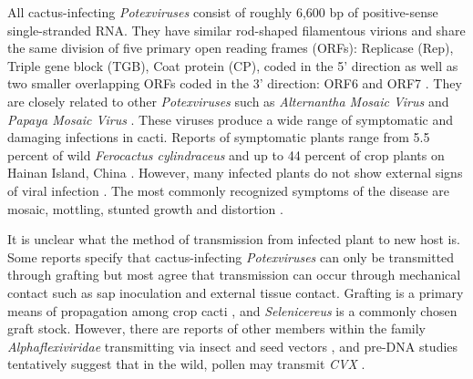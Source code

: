 \documentclass[11pt,letterpaper,titlepage]{article}
\begin{document}
\begin{linenumbers}
All cactus-infecting \textit{Potexviruses} consist of roughly 6,600 bp of positive-sense single-stranded RNA. They have similar rod-shaped filamentous virions and share the same division of five primary open reading frames (ORFs): Replicase (Rep), Triple gene block (TGB), Coat protein (CP), coded in the 5' direction as well as two smaller overlapping ORFs coded in the 3' direction: ORF6 and ORF7 \citep{evallo_brief_2021,liou_complete_2004, martelli_family_2007}.
They are closely related to other \textit{Potexviruses} such as \textit{Alternantha Mosaic Virus} and \textit{Papaya Mosaic Virus} \citep{martelli_family_2007,park_detection_2018,liou_complete_2004}.
These viruses produce a wide range of symptomatic and damaging infections in cacti. 
Reports of symptomatic plants range from 5.5 percent of wild \textit{Ferocactus cylindraceus} \citep{attathom_occurrence_1978} and up to 44 percent of crop plants on Hainan Island, China \citep{peng_molecular_2016}.
However, many infected plants do not show external signs of viral infection \citep{liou_complete_2004, bos_symptoms_1977}.
The most commonly recognized symptoms of the disease are mosaic, mottling, stunted growth and distortion \citep{maliarenko_cactus_2013, peng_molecular_2016, attathom_occurrence_1978}.

It is unclear what the method of transmission from infected plant to new host is. 
Some reports specify that cactus-infecting \textit{Potexviruses} can only be transmitted through grafting \citep{duarte_Potexvirus_2008, martelli_family_2007} but most agree that transmission can occur through mechanical contact such as sap inoculation \citep{liou_complete_2004,maliarenko_cactus_2013,park_detection_2018} and external tissue contact.
Grafting is a primary means of propagation among crop cacti \citep{park_detection_2018}, and \textit{Selenicereus} is a commonly chosen graft stock.
However, there are reports of other members within the family \textit{Alphaflexiviridae} transmitting via insect and seed vectors \citep{martelli_family_2007}, and pre-DNA studies tentatively suggest that in the wild, pollen may transmit \textit{CVX} \citep{attathom_occurrence_1978}.


\end{linenumbers}
\end{document}
